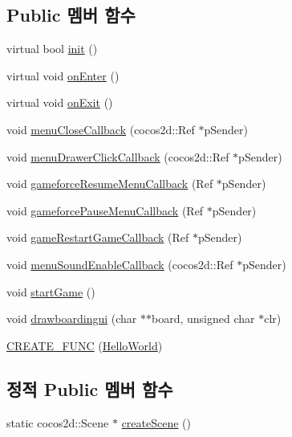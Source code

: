 \subsection*{Public 멤버 함수}
\begin{DoxyCompactItemize}
\item 
virtual bool \hyperlink{class_hello_world_a65e2b1525051f3690e5a39ca56608a97}{init} ()
\item 
virtual void \hyperlink{class_hello_world_a0e47c5b1692f5ba74b776be85422dc75}{on\+Enter} ()
\item 
virtual void \hyperlink{class_hello_world_a348da8e1c3061248666676878e692572}{on\+Exit} ()
\item 
void \hyperlink{class_hello_world_ac4ab2f5e922e659d4f137591c0f6a9b0}{menu\+Close\+Callback} (cocos2d\+::\+Ref $\ast$p\+Sender)
\item 
void \hyperlink{class_hello_world_a1609fd202ff4b899571aeb34b3cdaed4}{menu\+Drawer\+Click\+Callback} (cocos2d\+::\+Ref $\ast$p\+Sender)
\item 
void \hyperlink{class_hello_world_a9765d6e42b96bcf6c025ae1905bd7a90}{gameforce\+Resume\+Menu\+Callback} (Ref $\ast$p\+Sender)
\item 
void \hyperlink{class_hello_world_ac202dde4f557f0b9b6c3d150da4eec65}{gameforce\+Pause\+Menu\+Callback} (Ref $\ast$p\+Sender)
\item 
void \hyperlink{class_hello_world_a73ad0d041144a1e610534fe5df41d556}{game\+Restart\+Game\+Callback} (Ref $\ast$p\+Sender)
\item 
void \hyperlink{class_hello_world_aa0aab5c2537449752853c2924db53261}{menu\+Sound\+Enable\+Callback} (cocos2d\+::\+Ref $\ast$p\+Sender)
\item 
void \hyperlink{class_hello_world_aa4c36099096e160e3726819a2308dd04}{start\+Game} ()
\item 
void \hyperlink{class_hello_world_a0456ce3ab8880643c5e8739634156d93}{drawboardingui} (char $\ast$$\ast$board, unsigned char $\ast$clr)
\item 
\hyperlink{class_hello_world_a857ebfbc49f3a7f81772bee4991d186b}{C\+R\+E\+A\+T\+E\+\_\+\+F\+U\+NC} (\hyperlink{class_hello_world}{Hello\+World})
\end{DoxyCompactItemize}
\subsection*{정적 Public 멤버 함수}
\begin{DoxyCompactItemize}
\item 
static cocos2d\+::\+Scene $\ast$ \hyperlink{class_hello_world_a1b700f5f9de04271533d3fa099d7b014}{create\+Scene} ()
\end{DoxyCompactItemize}
